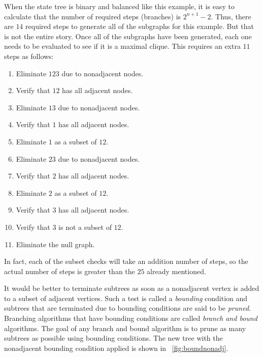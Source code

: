 When the state tree is binary and balanced like this example, it is easy to calculate that the number of required
steps (branches) is \(2^{n+1}-2\).  Thus, there are \(14\) required steps to generate all of the subgraphs for this
example.  But that is not the entire story.  Once all of the subgraphs have been generated, each one needs to be
evaluated to see if it is a maximal clique.  This requires an extra \(11\) steps as follows:
\begin{enumerate}
\item Eliminate \(123\) due to nonadjacent nodes.
\item Verify that \(12\) has all adjacent nodes.
\item Eliminate \(13\) due to nonadjacent nodes.
\item Verify that \(1\) has all adjacent nodes.
\item Eliminate \(1\) as a subset of \(12\).
\item Eliminate \(23\) due to nonadjacent nodes.
\item Verify that \(2\) has all adjacent nodes.
\item Eliminate \(2\) as a subset of \(12\).
\item Verify that \(3\) has all adjacent nodes.
\item Verify that \(3\) is not a subset of \(12\).
\item Eliminate the null graph.
\end{enumerate}

In fact, each of the subset checks will take an addition number of steps, so the actual number of steps is greater
than the \(25\) already mentioned.

It would be better to terminate subtrees as soon as a nonadjacent vertex is added to a subset of adjacent vertices.
Such a test is called a \emph{bounding} condition and subtrees that are terminated due to bounding conditions are
said to be \emph{pruned}.  Branching algorithms that have bounding conditions are called \emph{branch and bound}
algorithms.  The goal of any branch and bound algorithm is to prune as many subtrees as possible using bounding
conditions.  The new tree with the nonadjacent bounding condition applied is shown in
\figurename~\ref{fig:boundnonadj}.

